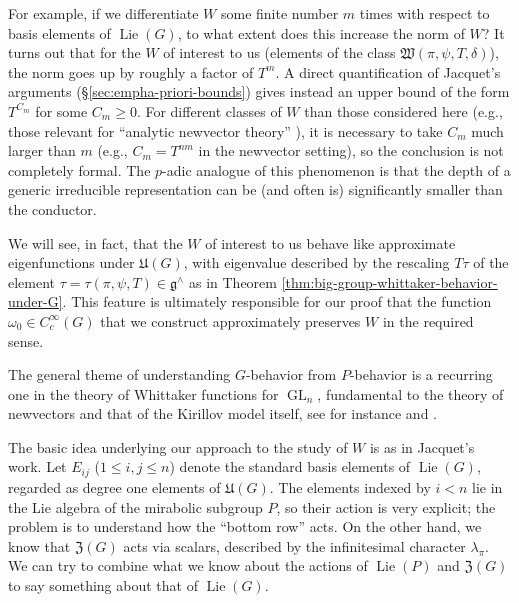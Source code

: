 \documentclass[reqno]{amsart}
\DeclareMathOperator{\GL}{GL}
\DeclareMathOperator{\Lie}{Lie}
\theoremstyle{plain} \newtheorem{theorem} {Theorem}
\theoremstyle{definition} \newtheorem{definition} [theorem] {Definition}
\theoremstyle{itplain} %
\numberwithin{equation}{section}
\numberwithin{theorem}{section}
\renewcommand{\geq}{\geqslant}
\renewcommand{\leq}{\leqslant}
\begin{document}
For example, if we differentiate $W$ some finite number $m$ times with respect to basis elements of $\Lie(G)$, to what extent does this increase the norm of $W$?  It turns out that for the $W$ of interest to us (elements of the class $\mathfrak{W}(\pi,\psi,T,\delta)$), the norm goes up by roughly a factor of $T^m$.  A direct quantification of Jacquet's arguments (\S\ref{sec:empha-priori-bounds}) gives instead an upper bound of the form $T^{C_m}$ for some $C_m \geq 0$.  For different classes of $W$ than those considered here (e.g., those relevant for ``analytic newvector theory'' \cite{JN19a, 2020arXiv200109640J}), it is necessary to take $C_m$ much larger than $m$ (e.g., $C_m = T^{n m}$ in the newvector setting), so the conclusion is not completely formal.  The $p$-adic analogue of this phenomenon is that the depth of a generic irreducible representation can be (and often is) significantly smaller than the conductor.

We will see, in fact, that the $W$ of interest to us behave like approximate eigenfunctions under $\mathfrak{U}(G)$, with eigenvalue described by the rescaling $T \tau$ of the element $\tau = \tau(\pi,\psi,T) \in \mathfrak{g}^\wedge$ as in Theorem \ref{thm:big-group-whittaker-behavior-under-G}.  This feature is ultimately responsible for our proof that the function $\omega_0 \in C_c^\infty(G)$ that we construct approximately preserves $W$ in the required sense.

The general theme of understanding $G$-behavior from $P$-behavior is a recurring one in the theory of Whittaker functions for $\GL_n$, fundamental to the theory of newvectors and that of the Kirillov model itself, see for instance \cite{MR620708, MR3138844, MR3001803} and \cite{MR0425030, MR0579172, MR748505,MR1999922}.

The basic idea underlying our approach to the study of $W$ is as in Jacquet's work.  Let $E_{i j}$ ($1 \leq i, j \leq n$) denote the standard basis elements of $\Lie(G)$, regarded as degree one elements of $\mathfrak{U}(G)$.  The elements indexed by $i < n$ lie in the Lie algebra of the mirabolic subgroup $P$, so their action is very explicit; the problem is to understand how the ``bottom row'' acts.  On the other hand, we know that $\mathfrak{Z}(G)$ acts via scalars, described by the infinitesimal character $\lambda_\pi$.  We can try to combine what we know about the actions of $\Lie(P)$ and $\mathfrak{Z}(G)$ to say something about that of $\Lie(G)$.
\end{document}
